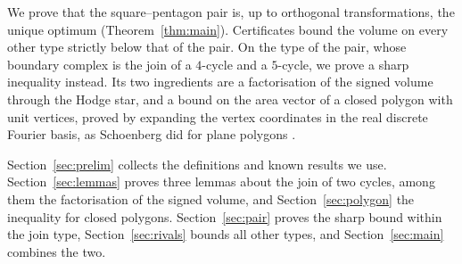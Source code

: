 We prove that the square--pentagon pair is, up to orthogonal transformations,
the unique optimum (Theorem~\ref{thm:main}). Certificates bound the volume on
every other type strictly below that of the pair. On the type of
the pair, whose boundary complex is the join of a $4$-cycle and a $5$-cycle,
we prove a sharp
inequality instead. Its two ingredients are a factorisation of the signed
volume through the Hodge star, and a bound on the area vector of a closed
polygon with unit vertices, proved by expanding the vertex coordinates in the
real discrete Fourier basis, as Schoenberg did for plane polygons
\cite{schoenberg-1950}.

Section~\ref{sec:prelim} collects the definitions and known results we use.
Section~\ref{sec:lemmas} proves three lemmas about the join of two cycles,
among them the factorisation of the signed volume, and
Section~\ref{sec:polygon} the inequality for closed polygons.
Section~\ref{sec:pair} proves the sharp bound within the join type,
Section~\ref{sec:rivals} bounds all other types, and
Section~\ref{sec:main} combines the two.
